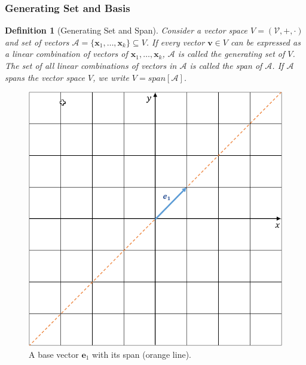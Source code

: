 \documentclass[12pt]{book}
\newtheorem{definition}{Definition}[section]
\begin{document}
	\subsubsection{Generating Set and Basis}
	\begin{definition}[Generating Set and Span]
		\normalfont Consider a vector space $\textit{V} = (\mathcal{V}, +, \cdot)$ and set of vectors $\mathcal{A} = \{\boldsymbol{x}_1,\ldots,\boldsymbol{x}_k\} \subseteq \textit{V}$. If every vector $\boldsymbol{v} \in \mathit{V}$ can be expressed as a linear combination of vectors of $\boldsymbol{x}_1,\ldots,\boldsymbol{x}_k$, $\mathcal{A}$ is called the generating set of $\textit{V}$. The set of all linear combinations of vectors in $\mathcal{A}$ is called the span of $\mathcal{A}$. If $\mathcal{A}$ spans the vector space $\textit{V}$, we write $\textit{V} = span[\mathcal{A}]$. 
	\end{definition}

	\begin{figure}[h]
		\centering
		\includegraphics[scale = 0.37]{span.png}
		\caption{A base vector $\textbf{e}_1$ with its span (orange line).}
		\label{fig:span}
	\end{figure}
	
\end{document}
